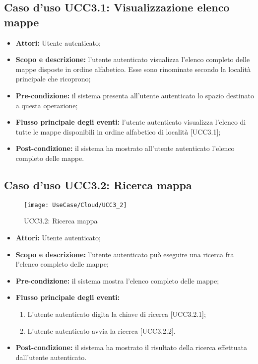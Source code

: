 \subsection{Caso d'uso UCC3.1: Visualizzazione elenco mappe}

\begin{itemize}
\item \textbf{Attori:} Utente autenticato;
\item \textbf{Scopo e descrizione:} l'utente autenticato visualizza l'elenco completo delle mappe disposte in ordine alfabetico. Esse sono rinominate secondo la località principale che ricoprono;
\item \textbf{Pre-condizione:} il sistema presenta all'utente autenticato lo spazio destinato a questa operazione;
\item \textbf{Flusso principale degli eventi:} l'utente autenticato visualizza l'elenco di tutte le mappe disponibili in ordine alfabetico di località [UCC3.1];
\item \textbf{Post-condizione:} il sistema ha mostrato all'utente autenticato l'elenco completo delle mappe.
\end{itemize}

\subsection{Caso d'uso UCC3.2: Ricerca mappa}

\begin{figure}[H]
\centering
\texttt{[image: UseCase/Cloud/UCC3\_2]}
\caption{UCC3.2: Ricerca mappa}
\end{figure}

\begin{itemize}
\item \textbf{Attori:} Utente autenticato;
\item \textbf{Scopo e descrizione:} l'utente autenticato può eseguire una ricerca fra l'elenco completo delle mappe;
\item \textbf{Pre-condizione:} il sistema mostra l'elenco completo delle mappe;
\item \textbf{Flusso principale degli eventi:}
\begin{enumerate}
\item L'utente autenticato digita la chiave di ricerca [UCC3.2.1];
\item L'utente autenticato avvia la ricerca [UCC3.2.2].
\end{enumerate}
\item \textbf{Post-condizione:} il sistema ha mostrato il risultato della ricerca effettuata dall'utente autenticato. 
\end{itemize}

